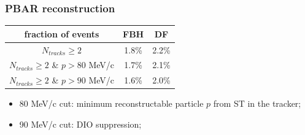 \documentclass{beamer}
\begin{document}
\begin{frame}
    \frametitle{PBAR reconstruction}
    \begin{table}[h!]
        \centering
        \hspace*{-0.5em}
        \renewcommand{\arraystretch}{1.}
           \begin{tabular}{| c | c | c |} 
            \hline
            {\scriptsize fraction of events} &  {\scriptsize FBH } &  {\scriptsize DF}\\
            \hline
              {\scriptsize $N_{tracks} \geq 2$} &   {\scriptsize 1.8\%} &  {\scriptsize 2.2\%}\\
            \hline
             {\scriptsize $N_{tracks} \geq 2$ \& $p>80$ MeV/c} &  {\scriptsize 1.7\%} &  {\scriptsize 2.1\%}\\
            \hline
             {\scriptsize $N_{tracks} \geq 2$ \& $p>90$ MeV/c } &  {\scriptsize 1.6\%} &  {\scriptsize 2.0\%}\\
            \hline
            \end{tabular}
        \label{tab:0bbpbar}
        \end{table}
        \begin{itemize}
        \item 80 MeV/c cut: minimum reconstructable particle $p$ from ST in the tracker;
 \item 90 MeV/c cut: DIO suppression;
        \end{itemize}
\end{frame}
\end{document}
